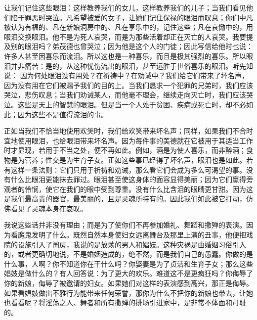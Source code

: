 让我们记住这些眼泪：这样教养我们的女儿，这样教养我们的儿子；当我们看见他们陷于罪恶时哭泣。凡希望被爱的女子，让她们记住保禄的眼泪而叹息；你们中凡被认为有福的、凡在新娘洞房中的、凡在享乐中的，记住这些；凡在哀恸中的，用眼泪交换眼泪。他不是为死人哀哭，而是为那些活着却正在灭亡的人哀哭。我要提及别的眼泪吗？弟茂德也曾哭泣；因为他是这个人的门徒；因此写信给他时也说： 许多人甚至因喜乐而流泪。所以这也是一种喜乐，而且是极其强烈的喜乐。所以眼泪并非痛苦：是的，从这种忧伤流出的眼泪，甚至远胜于世俗喜乐的眼泪。听先知说： 因为何处眼泪没有用处？在祈祷中？在劝诫中？我们给它们带来了坏名声，因为没有用在它们被赐予我们的目的上。当我们恳求一个犯罪的兄弟时，我们应该哭泣，悲伤叹息；当我们劝诫某人，而他毫不理会，继续走向灭亡时，我们应该哭泣。这些是天上的智慧的眼泪。但是当一个人处于贫困、疾病或死亡时，却不必如此；因为这些不是值得流泪的事。\par

正如当我们不恰当地使用欢笑时，我们给欢笑带来坏名声；同样，如果我们不合时宜地使用眼泪，也给眼泪带来坏名声。因为每件事的美德就在它被用于其适当工作时才显现，若用于不当之处，便不再如此。例如，酒是为使人喜乐，而非醉酒；食物是为营养；性交是为生育子女。正如这些事已经得了坏名声，眼泪也是如此。若有这样一条法则：它们只用于祈祷和劝诫，那么看它们会成为多么可渴望的事。没有什么比眼泪更能抹去罪过。眼泪甚至使这身体的面容显得美丽；因为它们赢得旁观者的怜悯，使它在我们的眼中受到尊重。没有什么比含泪的眼睛更甘甜。因为这是我们最高贵的器官，最美丽的，且是灵魂所特有的。因此我们如此被它打动，仿佛看见了灵魂本身在哀叹。\par

我说这些话并非没有理由；而是为了使你们不再参加婚礼、舞蹈和撒殚的表演。因为看魔鬼发明了什么。既然自然本身使妇女远离舞台及那里上演的丑事，他便把戏院的设施引入了闺房，我说的是放荡的男人和娼妓。这种灾祸是由婚姻习俗引入的，或者更确切地说，不是婚姻造成的，绝不然，而是我们自己的愚蠢。你做的是什么事，人啊？你不知道你在干什么吗？你娶妻是为了贞洁和生育子女；那么这些娼妓是做什么的？有人回答说：为了更大的欢乐。难道这不是更疯狂吗？你侮辱了你的新娘，侮辱了被邀请的妇女。如果她们对这样的表演感到高兴，那正是侮辱。如果看娼妓做出不雅行为能带来任何荣誉，那你为什么不把你的新娘也带去，让她也看看呢？将淫荡之人、舞者和所有撒殚的排场引进家中，是非常不体面和可耻的。\par

